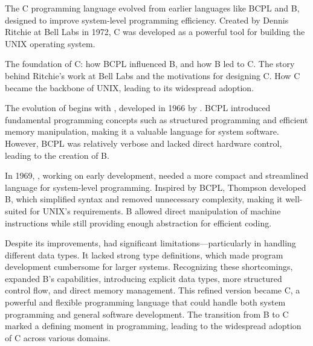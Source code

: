 \begin{NxSSSBox}
	\begin{NxIDBox}
		The C programming language evolved from earlier languages like BCPL and B, designed to improve system-level programming efficiency. Created by Dennis Ritchie at Bell Labs in 1972, C was developed as a powerful tool for building the UNIX operating system.
	\end{NxIDBox}
	\begin{NxIDBoxL}
		 The foundation of C: how BCPL influenced B, and how B led to C.
		 The story behind Ritchie's work at Bell Labs and the motivations for designing C.
		 How C became the backbone of UNIX, leading to its widespread adoption.
	\end{NxIDBoxL}
\end{NxSSSBox}

\begin{NxSSSSBox}
	\begin{NxIDBox}
		The evolution of  begins with , developed in 1966 by . BCPL introduced fundamental programming concepts such as structured programming and efficient memory manipulation, making it a valuable language for system software. However, BCPL was relatively verbose and lacked direct hardware control, leading to the creation of B.
	\end{NxIDBox}
	\begin{NxIDBox}
		In 1969, , working on early  development, needed a more compact and streamlined language for system-level programming. Inspired by BCPL, Thompson developed B, which simplified syntax and removed unnecessary complexity, making it well-suited for UNIX’s requirements. B allowed direct manipulation of machine instructions while still providing enough abstraction for efficient coding.
	\end{NxIDBox}
	\begin{NxIDBox}
		Despite its improvements,  had significant limitations—particularly in handling different data types. It lacked strong type definitions, which made program development cumbersome for larger systems. Recognizing these shortcomings,  expanded B’s capabilities, introducing explicit data types, more structured control flow, and direct memory management. This refined version became C, a powerful and flexible programming language that could handle both system programming and general software development. The transition from B to C marked a defining moment in programming, leading to the widespread adoption of C across various domains.
	\end{NxIDBox}
\end{NxSSSSBox}

